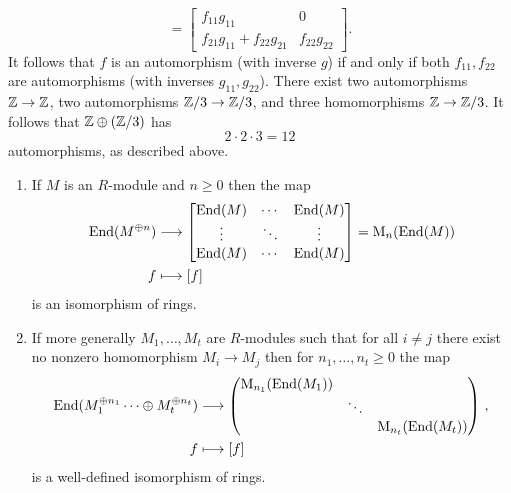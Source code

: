 \begin{example}
\[    = \begin{bmatrix}
        f_{11} g_{11}                 & 0             \\
        f_{21} g_{11} + f_{22} g_{21} & f_{22} g_{22}
      \end{bmatrix}.
  \]
  It follows that $f$ is an automorphism (with inverse $g$) if and only if both $f_{11}, f_{22}$ are automorphisms (with inverses $g_{11}, g_{22}$).
  There exist two automorphisms $\mathbb{Z} \to \mathbb{Z}$, two automorphisms $\mathbb{Z}/3 \to \mathbb{Z}/3$, and three homomorphisms $\mathbb{Z} \to \mathbb{Z}/3$.
  It follows that $\mathbb{Z} \oplus (\mathbb{Z}/3)$ has
  \[
      2 \cdot 2 \cdot 3
    = 12
  \]
  automorphisms, as described above.
\end{example}


\begin{corollary}
  \leavevmode
  \begin{enumerate}
    \item
      If $M$ is an $R$-module and $n \geq 0$ then the map
      \begin{align*}
                  \operatorname{End}(M^{\oplus n})
        &\longrightarrow  \begin{bmatrix}
                    \operatorname{End}(M) & \cdots  & \operatorname{End}(M) \\
                    \vdots  & \ddots  & \vdots  \\
                    \operatorname{End}(M) & \cdots  & \operatorname{End}(M)
                  \end{bmatrix}
        =        \operatorname{M}_n( \operatorname{End}(M) )
        \\
                      f
        &\longmapsto  [f]
      \end{align*}
      is an isomorphism of rings.
    \item
      If more generally $M_1, \dotsc, M_t$ are $R$-modules such that for all $i \neq j$ there exist no nonzero homomorphism $M_i \to M_j$ then for $n_1, \dotsc, n_t \geq 0$ the map
      \begin{align*}
                  \operatorname{End}(M_1^{\oplus n_1} \dotsb \oplus M_t^{\oplus n_t})
        &\longrightarrow  \begin{pmatrix}
                      \operatorname{M}_{n_1}( \operatorname{End}(M_1) )
                    & {}
                    & {}
                    \\
                      {}
                    & \ddots
                    & {}
                    \\
                      {}
                    & {}
                    & \operatorname{M}_{n_t}( \operatorname{End}(M_t) )
                  \end{pmatrix} \,,
        \\
                      f
        &\longmapsto  [f]
      \end{align*}
      is a well-defined isomorphism of rings.
  \end{enumerate}
\end{corollary}




